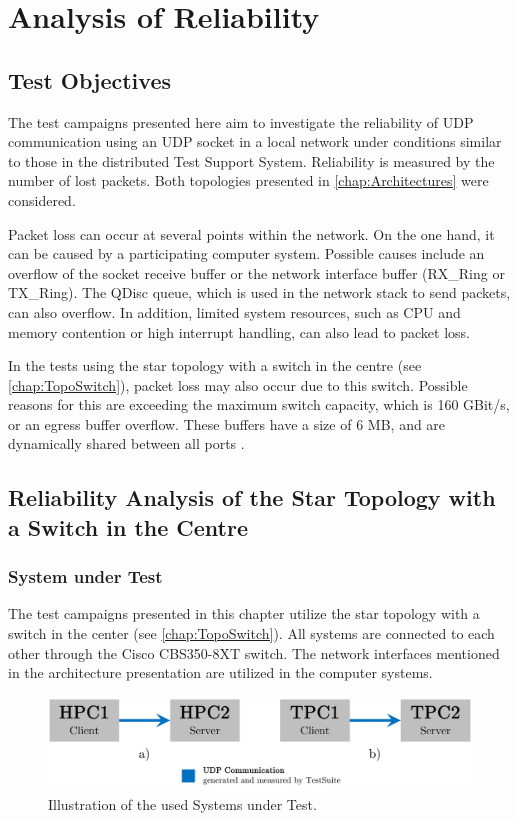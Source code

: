 \chapter{Analysis of Reliability}

\section{Test Objectives}

The test campaigns presented here aim to investigate the reliability of UDP communication using an UDP socket in a local network under conditions similar to those in the distributed Test Support System. Reliability is measured by the number of lost packets. Both topologies presented in \ref{chap:Architectures} were considered.

Packet loss can occur at several points within the network. On the one hand, it can be caused by a participating computer system. Possible causes include an overflow of the socket receive buffer or the network interface buffer (RX\_Ring or TX\_Ring). The QDisc queue, which is used in the network stack to send packets, can also overflow. In addition, limited system resources, such as CPU and memory contention or high interrupt handling, can also lead to packet loss.

In the tests using the star topology with a switch in the centre (see \ref{chap:TopoSwitch}), packet loss may also occur due to this switch. Possible reasons for this are exceeding the maximum switch capacity, which is 160 GBit/s, or an egress buffer overflow. These buffers have a size of 6 MB, and are dynamically shared between all ports \cite{setup09}.

\section{Reliability Analysis of the Star Topology with a Switch in the Centre} \label{chap:switchtest}

\subsection{System under Test}
The test campaigns presented in this chapter utilize the star topology with a switch in the center (see \ref{chap:TopoSwitch}). All systems are connected to each other through the Cisco CBS350-8XT switch. The network interfaces mentioned in the architecture presentation are utilized in the computer systems.

\begin{figure}[h!]
    \centering
    \includegraphics[width=1\linewidth]{figures/reliability/star/rel_g_1.pdf}
    \caption{Illustration of the used Systems under Test.}
    \label{fig:sutreliability}
\end{figure}

